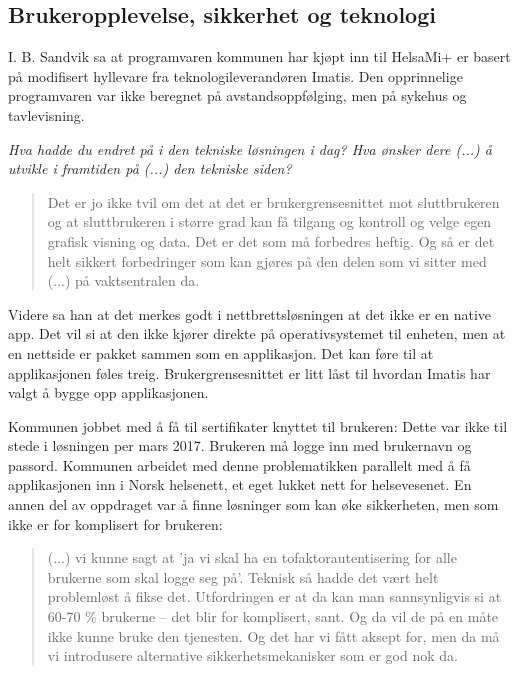 \subsection{Brukeropplevelse, sikkerhet og teknologi}
I. B. Sandvik sa at programvaren kommunen har kjøpt inn til HelsaMi+ er basert på modifisert hyllevare fra teknologileverandøren Imatis. Den opprinnelige
programvaren var ikke beregnet på avstandsoppfølging, men på sykehus og tavlevisning. 

\textit{Hva hadde du endret på i den tekniske løsningen i dag? Hva ønsker dere (...) å utvikle i framtiden på (...) den tekniske siden?}

\blockquote{Det er jo ikke tvil om det at det er brukergrensesnittet mot sluttbrukeren og at sluttbrukeren i større grad kan få tilgang og
kontroll og velge egen grafisk visning og
data. Det er det som må forbedres heftig. Og så er det helt sikkert forbedringer som kan gjøres på den delen som vi sitter med
(...) på vaktsentralen da.}

Videre sa han at det merkes godt i nettbrettsløsningen at det ikke er en native app. Det vil si at den ikke kjører direkte på
operativsystemet til enheten,
men at en nettside er pakket sammen som en applikasjon. Det kan føre til at applikasjonen føles treig. Brukergrensesnittet er litt låst til
hvordan Imatis har valgt å bygge opp applikasjonen.

Kommunen jobbet med å få til sertifikater knyttet til brukeren:  Dette var ikke
til stede i løsningen per mars 2017. Brukeren må logge inn med brukernavn og passord.
Kommunen arbeidet med denne problematikken parallelt med å få applikasjonen inn i Norsk helsenett, et eget
lukket nett for helsevesenet. En annen del av oppdraget var å finne løsninger som kan øke sikkerheten, men som ikke er for komplisert for brukeren:
\blockquote{(...) vi kunne sagt at 'ja vi skal ha en tofaktorautentisering for alle brukerne som skal logge seg på'. Teknisk så hadde det
    vært helt problemløst å fikse det. Utfordringen er at da kan man sannsynligvis si at 60-70 \% brukerne -- det blir for komplisert, sant.
    Og da vil de på en måte ikke kunne bruke den tjenesten. Og det har vi fått aksept for, men da må vi introdusere alternative sikkerhetsmekanisker
som er god nok da.}

